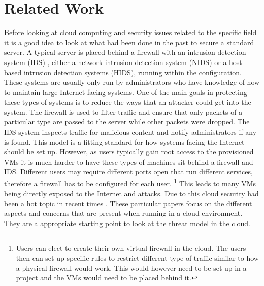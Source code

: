 \documentclass[12pt]{article}
\begin{document}
\section{Related Work}
Before looking at cloud computing and security issues related to the specific field it is a good idea to look at what had been done in the past to secure a standard server. A typical server is placed behind a firewall with an intrusion detection system (IDS) \cite{DigitalOcianServerSecurity}, either a network intrusion detection system (NIDS) or a host based intrusion detection systems (HIDS), running within the configuration. These systems are usually only run by administrators who have knowledge of how to maintain large Internet facing systems. One of the main goals in protecting these types of systems is to reduce the ways that an attacker could get into the system. The firewall is used to filter traffic and ensure that only packets of a particular type are passed to the server while other packets were dropped. The IDS system inspects traffic for malicious content and notify administrators if any is found. This model is a fitting standard for how systems facing the Internet should be set up. However, as users typically gain root access to the provisioned VMs it is much harder to have these types of machines sit behind a firewall and IDS. Different users may require different ports open that run different services, therefore a firewall has to be configured for each user. \footnote{Users can elect to create their own virtual firewall in the cloud. The users then can set up specific rules to restrict different type of traffic similar to how a physical firewall would work. This would however need to be set up in a project and the VMs would need to be placed behind it. } This leads to many VMs being directly exposed to the Internet and attacks. Due to this cloud security had been a hot topic in recent times \cite{zissis2012addressing, mishra2013cloud, krutz2010cloud}. These particular papers focus on the different aspects and concerns that are present when running in a cloud environment. They are a appropriate starting point to look at the threat model in the cloud.
\end{document}
